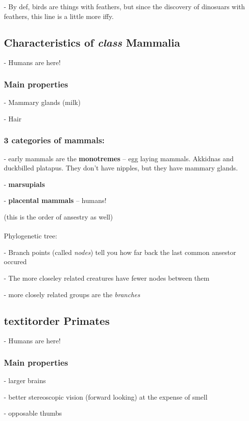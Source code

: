 \documentclass{article}
\theoremstyle{definition}
\begin{document}
- By def, birds are things with feathers, but since the discovery of dinosuars with feathers, this line is a little more iffy.

\subsection{Characteristics of \textit{class} Mammalia}
- Humans are here!

\subsubsection{Main properties}

\indent\indent- Mammary glands (milk)

\indent\indent- Hair

\subsubsection{3 categories of mammals:}
- early mammals are the \textbf{monotremes} -- egg laying mammals. Akkidnas and duckbilled platapus. They don't have nipples, but they have mammary glands.

- \textbf{marsupials} 

- \textbf{placental mammals} -- humans!

(this is the order of ansestry as well)\\~\\

Phylogenetic tree:

- Branch points (called \textit{nodes}) tell you how far back the last common ansestor occured

- The more closeley related creatures have fewer nodes between them

- more closely related groups are the \textit{branches} 

\subsection{textit{order} Primates}
- Humans are here!

\subsubsection{Main properties}
- larger brains

- better stereoscopic vision (forward looking) at the expense of smell

- opposable thumbs\\~\\
\end{document}
